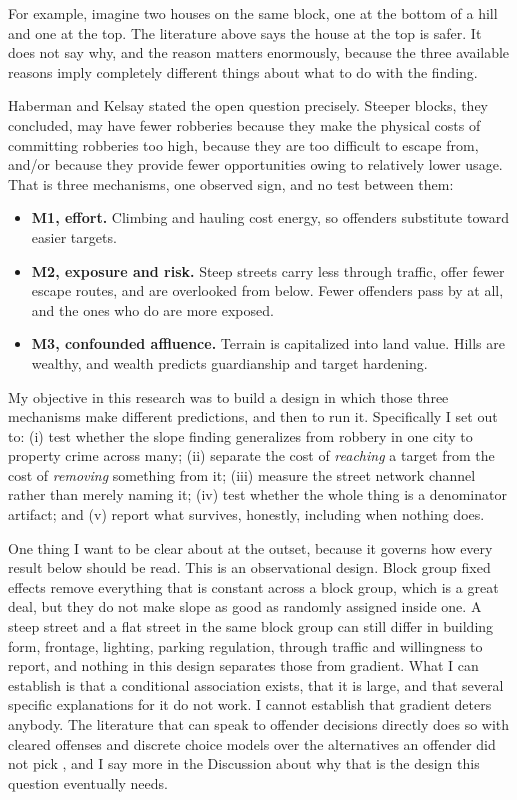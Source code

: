 \documentclass[11pt,letterpaper]{article}
\begin{document}
For example, imagine two houses on the same block, one at the bottom of a hill and
one at the top. The literature above says the house at the top is safer. It does not
say why, and the reason matters enormously, because the three available reasons imply
completely different things about what to do with the finding.

Haberman and Kelsay stated the open question precisely. Steeper blocks, they
concluded, may have fewer robberies because they make the physical costs of
committing robberies too high, because they are too difficult to escape from, and/or
because they provide fewer opportunities owing to relatively lower usage. That is
three mechanisms, one observed sign, and no test between them:

\begin{itemize}
\item \textbf{M1, effort.} Climbing and hauling cost energy, so offenders substitute
toward easier targets.
\item \textbf{M2, exposure and risk.} Steep streets carry less through traffic, offer
fewer escape routes, and are overlooked from below. Fewer offenders pass by at all,
and the ones who do are more exposed.
\item \textbf{M3, confounded affluence.} Terrain is capitalized into land value.
Hills are wealthy, and wealth predicts guardianship and target hardening.
\end{itemize}

My objective in this research was to build a design in which those three mechanisms
make different predictions, and then to run it. Specifically I set out to: (i) test
whether the slope finding generalizes from robbery in one city to property crime
across many; (ii) separate the cost of \emph{reaching} a target from the cost of
\emph{removing} something from it; (iii) measure the street network channel rather
than merely naming it; (iv) test whether the whole thing is a denominator artifact;
and (v) report what survives, honestly, including when nothing does.

One thing I want to be clear about at the outset, because it governs how every
result below should be read. This is an observational design. Block group fixed
effects remove everything that is constant across a block group, which is a great
deal, but they do not make slope as good as randomly assigned inside one. A steep
street and a flat street in the same block group can still differ in building form,
frontage, lighting, parking regulation, through traffic and willingness to report,
and nothing in this design separates those from gradient. What I can establish is
that a conditional association exists, that it is large, and that several specific
explanations for it do not work. I cannot establish that gradient deters anybody.
The literature that can speak to offender decisions directly does so with cleared
offenses and discrete choice models over the alternatives an offender did not pick
\cite{frith2017,johnsonsummers2015,clare2009}, and I say more in the Discussion
about why that is the design this question eventually needs.
\end{document}
